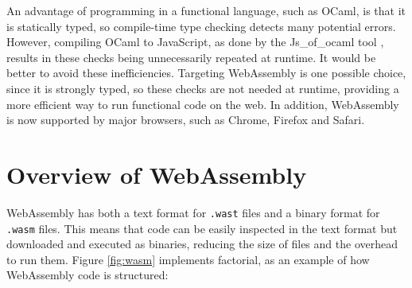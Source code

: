 

An advantage of programming in a functional language, such as OCaml, is that it is statically typed, so compile-time type checking detects many potential errors. However, compiling OCaml to JavaScript, as done by the Js\_of\_ocaml tool \cite{jsofocaml}, results in these checks being unnecessarily repeated at runtime. It would be better to avoid these inefficiencies.
Targeting WebAssembly is one possible choice, since it is strongly typed, so these checks are not needed at runtime, providing a more efficient way to run functional code on the web. In addition, WebAssembly is now supported by major browsers, such as Chrome, Firefox and Safari.



\section{Overview of WebAssembly}
WebAssembly has both a text format for \verb|.wast| files and a binary format for \verb|.wasm| files. This means that code can be easily inspected in the text format but downloaded and executed as binaries, reducing the size of files and the overhead to run them. Figure \ref{fig:wasm} implements factorial, as an example of how WebAssembly code is structured:

